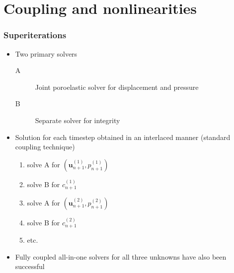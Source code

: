 \documentclass{beamer}
\begin{document}
\section{Coupling and nonlinearities}

\begin{frame}
  \frametitle{Superiterations}

  \begin{itemize}
  \item Two primary solvers
    \begin{description}
    \item[A] Joint poroelastic solver for displacement and pressure
    \item[B] Separate solver for integrity
    \end{description}
  \item<2-> Solution for each timestep obtained in an interlaced manner
    (standard coupling technique)
    \begin{enumerate}
      \item solve A for $(\bm u_{n+1}^{(1)}, p_{n+1}^{(1)})$
      \item solve B for $c_{n+1}^{(1)}$
      \item solve A for $(\bm u_{n+1}^{(2)}, p_{n+1}^{(2)})$
      \item solve B for $c_{n+1}^{(2)}$
      \item etc.
    \end{enumerate}
  \item<3-> Fully coupled all-in-one solvers for all three unknowns have also been successful
  \end{itemize}
\end{frame}
\end{document}
